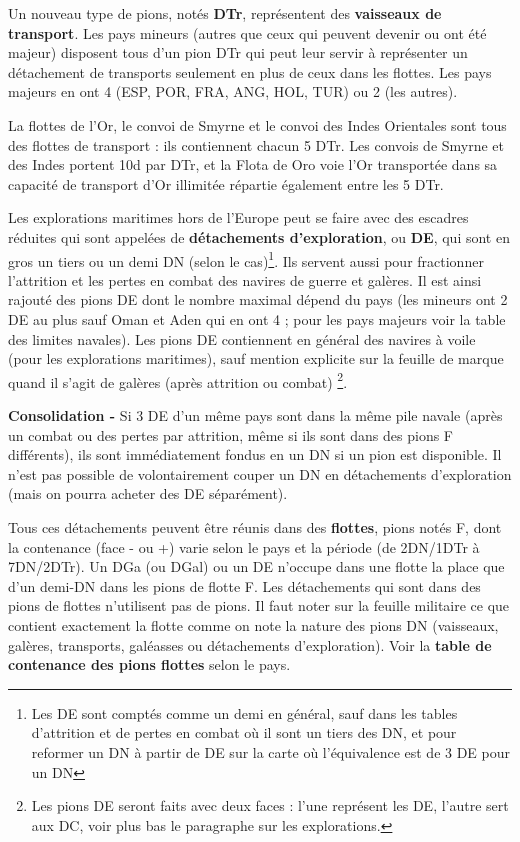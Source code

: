 Un nouveau type de pions, notés
{\bf DTr}, représentent des \textbf{vaisseaux de
transport}. Les pays mineurs (autres que ceux qui peuvent devenir ou ont été majeur)
disposent tous d'un pion DTr qui peut leur servir à représenter
un détachement de transports seulement en plus de ceux dans les flottes.
Les pays majeurs en ont 4 (ESP, POR, FRA, ANG, HOL, TUR)
ou 2 (les autres).

La flottes de l'Or, le convoi de Smyrne et le convoi des Indes Orientales
sont tous des flottes de transport : ils contiennent chacun
5 DTr. Les convois de Smyrne et des Indes portent 10d par DTr, et
la Flota de Oro voie l'Or transportée dans sa capacité de transport
d'Or illimitée répartie également entre les 5 DTr.
\medskip

Les explorations
maritimes hors de l'Europe peut se faire avec des escadres réduites
qui sont appelées de \textbf{détachements d'exploration}, ou {\bf DE}, qui sont
en gros un tiers ou un demi DN (selon le cas)\footnote{
Les DE sont comptés comme un demi en général, sauf dans les tables
d'attrition et de pertes en combat où il sont un tiers des DN, et
pour reformer un DN à partir de DE sur la carte où l'équivalence est
de 3 DE pour un DN}. Ils servent aussi pour fractionner l'attrition
et les pertes en combat des navires de guerre et galères.
Il est ainsi rajouté des pions DE dont le nombre maximal dépend du pays (les
mineurs ont 2 DE au plus sauf Oman et Aden qui en ont 4 ;
pour les pays majeurs voir la table
des limites navales). Les pions DE contiennent en général des navires
à voile (pour les explorations maritimes), sauf mention explicite sur la feuille
de marque quand il s'agit de galères (après attrition ou combat) \footnote{Les
pions DE seront faits avec deux faces : l'une représent les DE, l'autre
sert aux DC, voir plus bas le paragraphe sur les explorations.}.

\textbf{Consolidation -} Si 3 DE d'un même pays sont dans la même pile navale (après
un combat ou des pertes par attrition, même si ils sont dans des pions F différents),
ils sont immédiatement fondus en un DN si
un pion est disponible. Il n'est pas possible de volontairement
couper un DN en détachements d'exploration (mais on pourra acheter
des DE séparément).
\medskip

Tous ces détachements peuvent être réunis dans des \textbf{flottes}, pions notés F,
dont la contenance
(face - ou +) varie selon le pays et la période (de 2DN/1DTr à 7DN/2DTr).
Un DGa (ou DGal) ou un DE n'occupe dans une flotte la place que d'un demi-DN dans
les pions de flotte F.
Les détachements qui sont dans des pions de flottes
n'utilisent pas de pions. Il faut noter sur la feuille militaire ce que contient
exactement la flotte comme on note la nature des pions DN (vaisseaux,
galères, transports, galéasses ou détachements d'exploration).
Voir la \textbf{table de contenance des pions flottes} selon le pays.
\medskip

